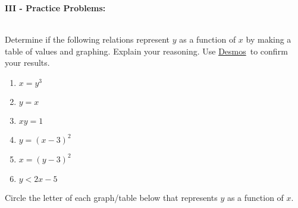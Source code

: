 \documentclass[12pt]{article}
\theoremstyle{definition}
\newcommand{\Desmos}{\href{https://www.desmos.com/}{Desmos}}
\begin{document}
{\bf III - Practice Problems:}\\
\ \par
Determine if the following relations represent $y$ as a function of $x$ by making a table of values and graphing.  Explain your reasoning.  Use \Desmos \ to confirm your results.
\begin{center}
\begin{multicols}{3}
\begin{enumerate}
	\item $x=y^3$
	\item $y=x$
	\item $xy=1$
	\item $y=(x-3)^2$
	\item $x=(y-3)^2$
	\item $y<2x-5$
\end{enumerate}
\end{multicols}
\end{center}
Circle the letter of each graph/table below that represents $y$ as a function of $x$.
\end{document}
